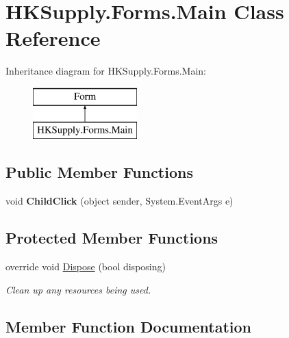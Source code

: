 \hypertarget{class_h_k_supply_1_1_forms_1_1_main}{}\section{H\+K\+Supply.\+Forms.\+Main Class Reference}
\label{class_h_k_supply_1_1_forms_1_1_main}
Inheritance diagram for H\+K\+Supply.\+Forms.\+Main\+:\begin{figure}[H]
\begin{center}
\leavevmode
\includegraphics[height=2.000000cm]{class_h_k_supply_1_1_forms_1_1_main}
\end{center}
\end{figure}
\subsection*{Public Member Functions}
\begin{DoxyCompactItemize}
\item 
\mbox{\label{class_h_k_supply_1_1_forms_1_1_main_ae322c78605a4993241d8cf837cc2e6fc}} 
void {\bfseries Child\+Click} (object sender, System.\+Event\+Args e)
\end{DoxyCompactItemize}
\subsection*{Protected Member Functions}
\begin{DoxyCompactItemize}
\item 
override void \hyperlink{class_h_k_supply_1_1_forms_1_1_main_a99fe43d79c789818b37bb46db1dfa795}{Dispose} (bool disposing)
\begin{DoxyCompactList}\small\item\em Clean up any resources being used. \end{DoxyCompactList}\end{DoxyCompactItemize}


\subsection{Member Function Documentation}
\mbox{\label{class_h_k_supply_1_1_forms_1_1_main_a99fe43d79c789818b37bb46db1dfa795}} 
